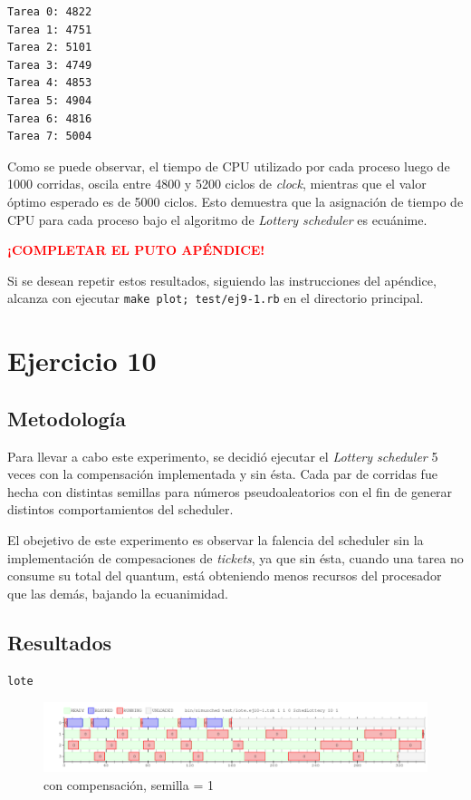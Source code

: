 \documentclass[a4paper]{article}
\begin{document}
\begin{verbatim}
Tarea 0: 4822
Tarea 1: 4751
Tarea 2: 5101
Tarea 3: 4749
Tarea 4: 4853
Tarea 5: 4904
Tarea 6: 4816
Tarea 7: 5004
\end{verbatim}

Como se puede observar, el tiempo de CPU utilizado por cada proceso luego de
1000 corridas, oscila entre 4800 y 5200 ciclos de \textit{clock}, mientras
que el valor óptimo esperado es de 5000 ciclos. Esto demuestra que la
asignación de tiempo de CPU para cada proceso bajo el algoritmo de
\textit{Lottery scheduler} es ecuánime.

\textcolor{red}{\textbf{¡COMPLETAR EL PUTO APÉNDICE!}}

Si se desean repetir estos resultados, siguiendo las instrucciones del
apéndice, alcanza con ejecutar \verb|make plot; test/ej9-1.rb| en el
directorio principal.

\section{Ejercicio 10}

\subsection{Metodología}
Para llevar a cabo este experimento, se decidió ejecutar el \textit{Lottery
scheduler} 5 veces con la compensación implementada y sin ésta. Cada par de
corridas fue hecha con distintas semillas para números pseudoaleatorios con
el fin de generar distintos comportamientos del scheduler.

El obejetivo de este experimento es observar la falencia del scheduler sin
la implementación de compesaciones de \textit{tickets}, ya que sin ésta,
cuando una tarea no consume su total del quantum, está obteniendo menos
recursos del procesador que las demás, bajando la ecuanimidad.

\subsection{Resultados}
\begin{verbatim}
lote
\end{verbatim}


\begin{figure}[H]
\begin{center}
\includegraphics[scale=0.4]{imagenes/ej10-1-c-s-1.png}
\end{center}
\caption{con compensación, semilla = 1}
\end{figure}
\end{document}

